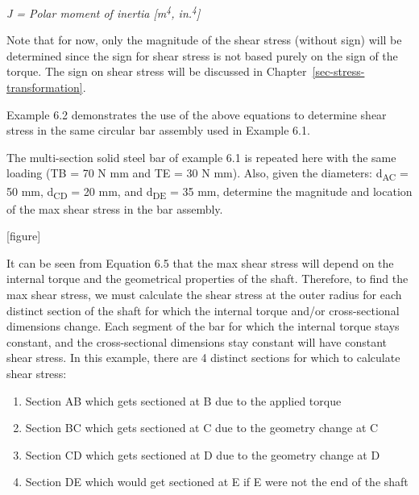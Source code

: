 \documentclass[
  letterpaper,
  DIV=11,
  numbers=noendperiod]{scrreprt}
\providecommand{\tightlist}{%
  \setlength{\itemsep}{0pt}\setlength{\parskip}{0pt}}\usepackage{longtable,booktabs,array}
\theoremstyle{definition}
\theoremstyle{remark}
\begin{document}
\emph{J = Polar moment of inertia {[}m\textsuperscript{4},
in.\textsuperscript{4}{]}}

Note that for now, only the magnitude of the shear stress (without sign)
will be determined since the sign for shear stress is not based purely
on the sign of the torque. The sign on shear stress will be discussed in
Chapter~\ref{sec-stress-transformation}.

Example 6.2 demonstrates the use of the above equations to determine
shear stress in the same circular bar assembly used in Example 6.1.

\begin{tcolorbox}[enhanced jigsaw, leftrule=.75mm, colbacktitle=quarto-callout-tip-color!10!white, breakable, opacityback=0, colback=white, titlerule=0mm, toprule=.15mm, colframe=quarto-callout-tip-color-frame, coltitle=black, title={Example 6.2}, toptitle=1mm, bottomrule=.15mm, rightrule=.15mm, left=2mm, arc=.35mm, opacitybacktitle=0.6, bottomtitle=1mm]

The multi-section solid steel bar of example 6.1 is repeated here with
the same loading (TB = 70 N mm and TE = 30 N mm). Also, given the
diameters: d\textsubscript{AC} = 50 mm, d\textsubscript{CD} = 20 mm, and
d\textsubscript{DE} = 35 mm, determine the magnitude and location of the
max shear stress in the bar assembly.

{[}figure{]}

\begin{tcolorbox}[enhanced jigsaw, leftrule=.75mm, colbacktitle=quarto-callout-tip-color!10!white, breakable, opacityback=0, colback=white, titlerule=0mm, toprule=.15mm, colframe=quarto-callout-tip-color-frame, coltitle=black, title={Solution}, toptitle=1mm, bottomrule=.15mm, rightrule=.15mm, left=2mm, arc=.35mm, opacitybacktitle=0.6, bottomtitle=1mm]

It can be seen from Equation 6.5 that the max shear stress will depend
on the internal torque and the geometrical properties of the shaft.
Therefore, to find the max shear stress, we must calculate the shear
stress at the outer radius for each distinct section of the shaft for
which the internal torque and/or cross-sectional dimensions change. Each
segment of the bar for which the internal torque stays constant, and the
cross-sectional dimensions stay constant will have constant shear
stress. In this example, there are 4 distinct sections for which to
calculate shear stress:

\begin{enumerate}
\def\labelenumi{\arabic{enumi}.}
\tightlist
\item
  Section AB which gets sectioned at B due to the applied torque
\item
  Section BC which gets sectioned at C due to the geometry change at C
\item
  Section CD which gets sectioned at D due to the geometry change at D
\item
  Section DE which would get sectioned at E if E were not the end of the
  shaft
\end{enumerate}


\end{tcolorbox}
\end{tcolorbox}
\end{document}
